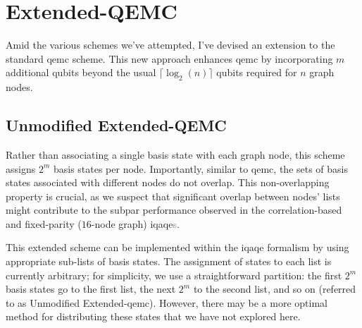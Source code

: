 










\section{Extended-QEMC}
\label{section:Extended_QEMC}


Amid the various schemes we've attempted, I've devised an extension to the standard \acrshort{qemc} scheme. This new approach enhances \acrshort{qemc} by incorporating $m$ additional qubits beyond the usual $\lceil\log_2(n)\rceil$ qubits required for $n$ graph nodes.

\subsection{Unmodified Extended-QEMC}
\label{subsection:Vanilla_Extended_QEMC}

Rather than associating a single basis state with each graph node, this scheme assigns $2^m$ basis states per node. Importantly, similar to \acrshort{qemc}, the sets of basis states associated with different nodes do not overlap. This non-overlapping property is crucial, as we suspect that significant overlap between nodes' lists might contribute to the subpar performance observed in the correlation-based and fixed-parity ($16$-node graph) \acrshort{iqaqe}\textcolor{gray}{s}.

This extended scheme can be implemented within the \acrshort{iqaqe} formalism by using appropriate sub-lists of basis states. The assignment of states to each list is currently arbitrary; for simplicity, we use a straightforward partition: the first $2^m$ basis states go to the first list, the next $2^m$ to the second list, and so on (referred to as Unmodified Extended-\acrshort{qemc}). However, there may be a more optimal method for distributing these states that we have not explored here.

